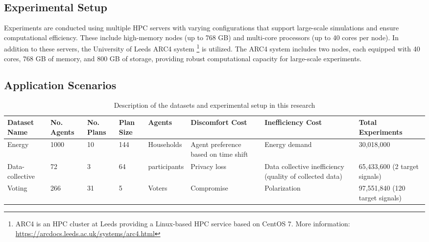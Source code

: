 \documentclass[journal]{IEEEtran}
\begin{document}
\subsection{Experimental Setup}
Experiments are conducted using multiple HPC servers with varying configurations that support large-scale simulations and ensure computational efficiency. These include high-memory nodes (up to 768 GB) and multi-core processors (up to 40 cores per node). In addition to these servers, the University of Leeds ARC4 system \footnote{ARC4 is an HPC cluster at Leeds providing a Linux-based HPC service based on CentOS 7. More information: \url{https://arcdocs.leeds.ac.uk/systems/arc4.html}} is utilized. The ARC4 system includes two nodes, each equipped with 40 cores, 768 GB of memory, and 800 GB of storage, providing robust computational capacity for large-scale experiments.


\subsection{Application Scenarios}

\begin{table*}[htbp]
  \centering
  \caption{Description of the datasets and experimental setup in this research}
  \begin{adjustbox}{width=\textwidth}
  \begin{tabular}{p{2cm}p{1cm}p{1cm}p{1cm}p{1.5cm}p{2.5cm}p{3.5cm}p{2.2cm}} 
    \toprule
    \textbf{Dataset Name} & \textbf{No. Agents} & \textbf{No. Plans} &  \textbf{Plan Size} & \textbf{Agents}&\textbf{Discomfort Cost}& \textbf{Inefficiency Cost} & \textbf{Total Experiments} \\
    \midrule
    Energy & 1000 & 10 & 144 & Households &Agent preference based on time shift & Energy demand & 30,018,000 \\ 
     \midrule
     Data-collective & 72  & 3  & 64 & participants  & Privacy loss & Data collective inefficiency (quality of collected data) & 65,433,600 (2 target signals) \\ 
     \midrule
     Voting  & 266  & 31 & 5  & Voters  & Compromise &  Polarization & 97,551,840 (120 target signals) \\ 
    \bottomrule
  \end{tabular}
\end{adjustbox}
\label{t3}
\end{table*}
\end{document}
